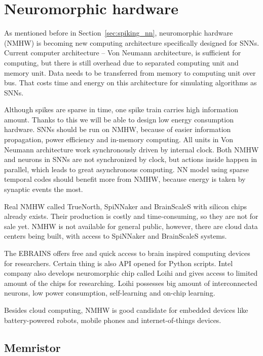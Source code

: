 \chapter{Neuromorphic hardware}%
\label{cha:neurom_hw}

As mentioned before in Section~\ref{sec:spiking_nn}, neuromorphic hardware (NMHW) is becoming new computing architecture specifically designed for SNNs. Current computer architecture -- Von Neumann architecture, is sufficient for computing, but there is still overhead due to separated computing unit and memory unit. Data needs to be transferred from memory to computing unit over bus. That costs time and energy on this architecture for simulating algorithms as SNNs.

Although spikes are sparse in time, one spike train carries high information amount. Thanks to this we will be able to design low energy consumption hardware. SNNs should be run on NMHW, because of easier information propagation, power efficiency and in-memory computing. All units in Von Neumann architecture work synchronously driven by internal clock. Both NMHW and neurons in SNNs are not synchronized by clock, but actions inside happen in parallel, which leads to great asynchronous computing. NN model using sparse temporal codes should benefit more from NMHW, because energy is taken by synaptic events the most. \cite{dl-with-sneurons}

Real NMHW called TrueNorth, SpiNNaker and BrainScaleS with silicon chips already exists. Their production is costly and time-consuming, so they are not for sale yet. NMHW is not available for general public, however, there are cloud data centers being built, with access to SpiNNaker and BrainScaleS systems. \cite{ebrains}

The EBRAINS offers free and quick access to brain inspired computing devices for researchers. Certain thing is also API opened for Python scripts.
Intel company also develops neuromorphic chip called Loihi and gives access to limited amount of the chips for researching. Loihi possesses big amount of interconnected neurons, low power consumption, self-learning and on-chip learning. \cite{intel}

Besides cloud computing, NMHW is good candidate for embedded devices like battery-powered robots, mobile phones and internet-of-things devices.

\section{Memristor}%
\label{sec:memristor}

